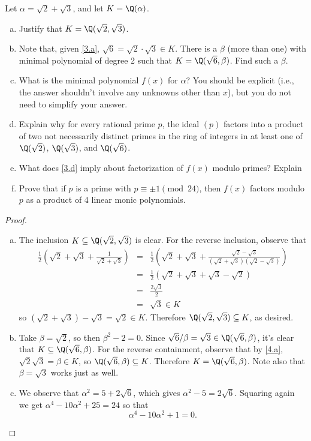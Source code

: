 \documentclass[10pt]{amsart}
\begin{document}
\begin{thm}\label{Ex3}
	Let $\alpha = \sqrt{2} + \sqrt{3}$, and let $K = \Q(\alpha)$.
	\begin{enumerate}[(a)]
		\item\label{3.a}
		Justify that $K = \Q(\sqrt{2},\sqrt{3})$.
		\item\label{3.b}
		Note that, given \eqref{3.a}, $\sqrt{6} = \sqrt{2}\cdot\sqrt{3} \in K$.
		There is a $\beta$ (more than one) with minimal polynomial of degree 2 such that $K = \Q(\sqrt{6}, \beta)$.
		Find such a $\beta$.
		\item\label{3.c}
		What is the minimal polynomial $f(x)$ for $\alpha$?
		You should be explicit (i.e., the answer shouldn't involve any unknowns other than $x$), but you do not need to simplify your answer.
		\item\label{3.d}
		Explain why for every rational prime $p$, the ideal $(p)$ factors into a product of two not necessarily distinct primes in the ring of integers in at least one of $\Q(\sqrt{2})$, $\Q(\sqrt{3})$, and $\Q(\sqrt{6})$.
		\item\label{3.e}
		What does \eqref{3.d} imply about factorization of $f(x)$ modulo primes?
		Explain
		\item\label{3.f}
		Prove that if $p$ is a prime with $p \equiv \pm 1 \pmod{24}$, then $f(x)$ factors modulo $p$ as a product of 4 linear monic polynomials.
	\end{enumerate}

	\begin{proof}
		\begin{enumerate}[(a)]
			\item
			The inclusion $K \subseteq \Q(\sqrt{2},\sqrt{3})$ is clear.
			For the reverse inclusion, observe that
			\begin{eqnarray*}
				\frac{1}{2}\left(\sqrt{2} + \sqrt{3} + \frac{1}{\sqrt{2} + \sqrt{3}}\right) &=& \frac{1}{2}\left(\sqrt{2} + \sqrt{3} + \frac{\sqrt{2} - \sqrt{3}}{(\sqrt{2} + \sqrt{3})(\sqrt{2} - \sqrt{3})}\right)\\
				&=& \frac{1}{2} \left( \sqrt{2} + \sqrt{3} + \sqrt{3} - \sqrt{2} \right)\\
				&=& \frac{2\sqrt{3}}{2}\\
				&=& \sqrt{3} \in K
			\end{eqnarray*}
			so $(\sqrt{2} + \sqrt{3}) - \sqrt{3} = \sqrt{2} \in K$.
			Therefore $\Q(\sqrt{2},\sqrt{3}) \subseteq K$, as desired.
			\item
			Take $\beta = \sqrt{2}$, so then $\beta^2 - 2 = 0$.
			Since $\sqrt{6}/\beta = \sqrt{3} \in \Q(\sqrt{6}, \beta)$, it's clear that $K \subseteq \Q(\sqrt{6}, \beta)$.
			For the reverse containment, observe that by \eqref{4.a}, $\sqrt{2}\sqrt{3} = \beta \in K$, so $\Q(\sqrt{6}, \beta) \subseteq K$.
			Therefore $K = \Q(\sqrt{6}, \beta)$.
			Note also that $\beta = \sqrt{3}$ works just as well.
			\item
			We observe that $\alpha^2 = 5 + 2\sqrt{6}$, which gives $\alpha^2 - 5 = 2\sqrt{6}$.
			Squaring again we get $\alpha^4 - 10\alpha^2 + 25 = 24$ so that
			$$\alpha^4 - 10\alpha^2 + 1 = 0.$$
			

\end{enumerate}
\end{proof}
\end{thm}
\end{document}
